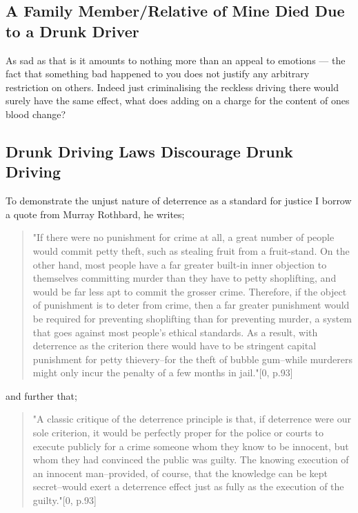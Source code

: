 \documentclass[11pt]{article}
\begin{document}
\subsection{A Family Member/Relative of Mine Died Due to a Drunk Driver}
\label{sec:org0f51bb0}

As sad as that is it amounts to nothing more than an appeal to emotions --- the fact that something bad happened to you does not justify any arbitrary restriction on others. Indeed just criminalising the reckless driving there would surely have the same effect, what does adding on a charge for the content of ones blood change?


\subsection{Drunk Driving Laws Discourage Drunk Driving}
\label{sec:org99a54aa}

To demonstrate the unjust nature of deterrence as a standard for justice I borrow a quote from Murray Rothbard, he writes;

\begin{quote}
"If there were no punishment for crime at all, a great number of people would commit petty theft, such as stealing fruit from a fruit-stand. On the other hand, most people have a far greater built-in inner objection to themselves committing murder than they have to petty shoplifting, and would be far less apt to commit the grosser crime. Therefore, if the object of punishment is to deter from crime, then a far greater punishment would be required for preventing shoplifting than for preventing murder, a system that goes against most people's ethical standards. As a result, with deterrence as the criterion there would have to be stringent capital punishment for petty thievery--for the theft of bubble gum--while murderers might only incur the penalty of a few months in jail."[0, p.93]
\end{quote}

and further that;

\begin{quote}
"A classic critique of the deterrence principle is that, if deterrence were our sole criterion, it would be perfectly proper for the police or courts to execute publicly for a crime someone whom they know to be innocent, but whom they had convinced the public was guilty. The knowing execution of an innocent man--provided, of course, that the knowledge can be kept secret--would exert a deterrence effect just as fully as the execution of the guilty."[0, p.93]
\end{quote}
\end{document}
